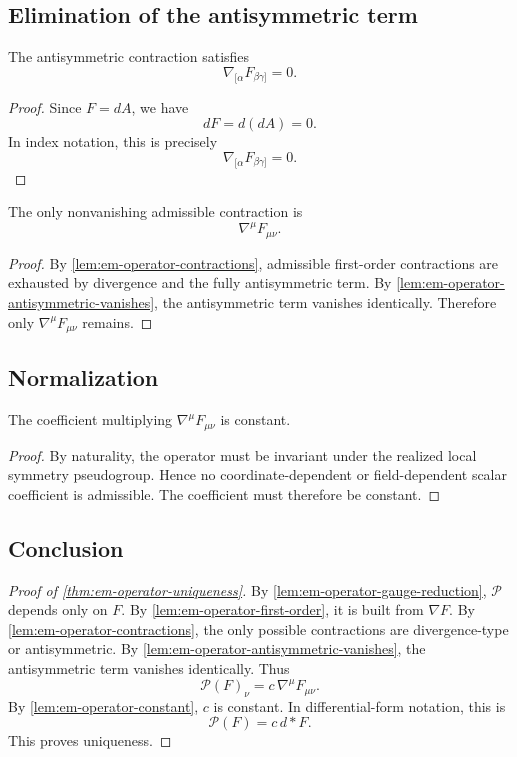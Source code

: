 \subsection{Elimination of the antisymmetric term}
\begin{lemma}
	\label{lem:em-operator-antisymmetric-vanishes}
	The antisymmetric contraction satisfies
	\[
		\nabla_{[\alpha}F_{\beta\gamma]} = 0.
	\]
\end{lemma}
\begin{proof}
	Since $F=dA$, we have
	\[
		dF = d(dA) = 0.
	\]
	In index notation, this is precisely
	\[
		\nabla_{[\alpha}F_{\beta\gamma]} = 0.
	\]
\end{proof}
\begin{corollary}
	The only nonvanishing admissible contraction is
	\[
		\nabla^\mu F_{\mu\nu}.
	\]
\end{corollary}
\begin{proof}
	By \cref{lem:em-operator-contractions}, admissible first-order
	contractions are exhausted by divergence and the fully antisymmetric
	term.
	By \cref{lem:em-operator-antisymmetric-vanishes}, the antisymmetric term
	vanishes identically.
	Therefore only \(\nabla^\mu F_{\mu\nu}\) remains.
\end{proof}
\subsection{Normalization}
\begin{lemma}
	\label{lem:em-operator-constant}
	The coefficient multiplying $\nabla^\mu F_{\mu\nu}$ is constant.
\end{lemma}
\begin{proof}
	By naturality, the operator must be invariant under the realized local
	symmetry pseudogroup.
	Hence no coordinate-dependent or field-dependent scalar coefficient is
	admissible.
	The coefficient must therefore be constant.
\end{proof}
\subsection{Conclusion}
\begin{proof}[Proof of \cref{thm:em-operator-uniqueness}]
	By \cref{lem:em-operator-gauge-reduction}, $\mathcal P$ depends only on $F$.
	By \cref{lem:em-operator-first-order}, it is built from
	$\nabla F$.
	By \cref{lem:em-operator-contractions}, the only possible contractions
	are divergence-type or antisymmetric.
	By \cref{lem:em-operator-antisymmetric-vanishes}, the antisymmetric term
	vanishes identically.
	Thus
	\[
		\mathcal P(F)_\nu = c\, \nabla^\mu F_{\mu\nu}.
	\]
	By \cref{lem:em-operator-constant}, $c$ is constant.
	In differential-form notation, this is
	\[
		\mathcal P(F)=c\, d{*}F.
	\]
	This proves uniqueness.
\end{proof}
